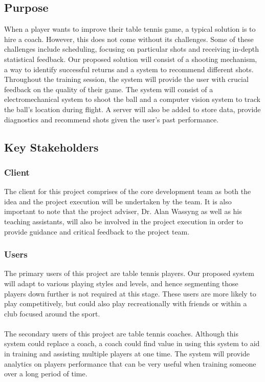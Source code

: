 \documentclass[11pt]{article}
\begin{document}
\subsection{Purpose}
When a player wants to improve their table tennis game, a typical solution is to hire a coach. However, this does not come without its challenges. Some of these challenges include scheduling, focusing on particular shots and receiving in-depth statistical feedback. Our proposed solution will consist of a shooting mechanism, a way to identify successful returns and a system to recommend different shots. Throughout the training session, the system will provide the user with crucial feedback on the quality of their game. The system will consist of a electromechanical system to shoot the ball and a computer vision system to track the ball's location during flight. A server will also be added to store data, provide diagnostics and recommend shots given the user's past performance.
\subsection{Key Stakeholders}
\subsubsection{Client}
The client for this project comprises of the core development team as both the idea and the project execution will be undertaken by the team. It is also important to note that the project adviser, Dr. Alan Wassyng as well as his teaching assistants, will also be involved in the project execution in order to provide guidance and critical feedback to the project team.
\subsubsection{Users}
The primary users of this project are table tennis players. Our proposed system will adapt to various playing styles and levels, and hence segmenting those players down further is not required at this stage. These users are more likely to play competitively, but could also play recreationally with friends or within a club focused around the sport. \\\\
The secondary users of this project are table tennis coaches. Although this system could replace a coach, a coach could find value in using this system to aid in training and assisting multiple players at one time. The system will provide analytics on players performance that can be very useful when training someone over a long period of time.
\end{document}
